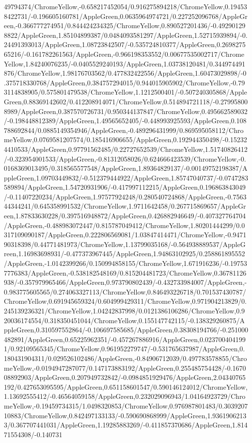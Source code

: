 {\begin{tikzternal}
49794374/ChromeYellow,-0.658217452054/0.916275894218/ChromeYellow,0.194538422731/-0.196605160781/AppleGreen,0.0635964974721/0.227252096768/AppleGreen,-0.366777274951/0.844424234325/ChromeYellow,0.890527201436/-0.492901298822/AppleGreen,1.85104899387/0.0484093581297/AppleGreen,1.52715939894/-0.24491393013/AppleGreen,1.08723842507/-0.535724810377/AppleGreen,0.269827565216/-0.161782261563/AppleGreen,-0.966198353552/0.00677535002717/ChromeYellow,1.84240076235/-0.0405529240193/AppleGreen,1.03738120481/0.344974491876/ChromeYellow,1.98176703562/0.477832422556/AppleGreen,1.60473029898/-0.375718330768/AppleGreen,0.384757294015/0.944015905902/ChromeYellow,-0.793114838905/0.575801479538/ChromeYellow,1.1212500401/-0.507240305868/AppleGreen,0.88369142602/0.412208914071/ChromeYellow,0.514894721118/-0.279958008989/AppleGreen,0.387570726731/0.950344137847/ChromeYellow,0.495662589032/-0.198448812389/AppleGreen,1.49565652405/-0.448993925593/AppleGreen,0.108788692844/0.0885149354946/AppleGreen,-0.489296431999/0.869595058112/ChromeYellow,0.0769581207574/0.185416906655/AppleGreen,0.192944350498/-0.152324410533/AppleGreen,0.97791562485/0.22727652539/ChromeYellow,1.51740826412/-0.323954001533/AppleGreen,-0.81312058026/0.624666423539/ChromeYellow,-0.0168369013495/0.318565577548/AppleGreen,1.89364829137/-0.00149752198387/AppleGreen,1.09703449832/-0.512379444922/AppleGreen,1.85747040737/-0.0747283589894/AppleGreen,1.54720931906/-0.417997112215/AppleGreen,0.196863843049/-0.11407220234/AppleGreen,1.97577924248/0.280540724868/AppleGreen,-0.756344344241/0.645358991532/ChromeYellow,1.9711642458/0.267715869657/AppleGreen,1.87833630228/0.397516948872/AppleGreen,0.426882946649/-0.407327764704/AppleGreen,-0.488983072447/0.815787049412/ChromeYellow,1.80201444299/0.0317109090187/AppleGreen,0.222806569081/1.03847414471/ChromeYellow,-0.947190318398/0.44771481973/ChromeYellow,1.13799035168/-0.564938889537/AppleGreen,1.16983698931/-0.477373967445/AppleGreen,1.94863102925/0.258861895552/AppleGreen,-1.0142399266/0.150994858155/ChromeYellow,1.671916236/-0.197537776383/AppleGreen,-0.538182548169/0.815204481723/ChromeYellow,0.36781126938/-0.357979965466/AppleGreen,0.973790802439/-0.432733984007/AppleGreen,-0.983775605565/0.274063327113/ChromeYellow,0.846493226718/0.701537430787/ChromeYellow,0.691945659324/0.604999429311/ChromeYellow,0.971904213829/0.245139236321/ChromeYellow,1.04242837998/0.0121386106286/ChromeYellow,0.920036174554/0.318350451044/ChromeYellow,0.155147742115/-0.138329260875/AppleGreen,0.310597552864/-0.106697585685/AppleGreen,0.38308194766/-0.251000482891/AppleGreen,0.65225962351/-0.457267886916/AppleGreen,0.0237004041991/0.92109565345/ChromeYellow,0.961952279747/-0.531765637987/AppleGreen,0.180431904311/0.029526102486/AppleGreen,-0.84906712039/0.497783578855/ChromeYellow,-0.0194947287077/0.147173883192/AppleGreen,0.255485754428/-0.167008892903/AppleGreen,0.207949732842/-0.0984851929476/AppleGreen,2.04340765192/0.427653095595/AppleGreen,0.651158601547/0.590146124012/ChromeYellow,1.13692555412/-0.46564059158/AppleGreen,0.232029096943/1.04164923729/ChromeYellow,-0.19459734315/1.0498320853/ChromeYellow,0.976987801483/0.303920710883/ChromeYellow,0.842497133133/-0.590690868999/AppleGreen,1.93619062133/0.367707441031/AppleGreen,1.19285883269/-0.411857370686/AppleGreen,1.81471554308/-0.140731
\end{tikzternal}}
